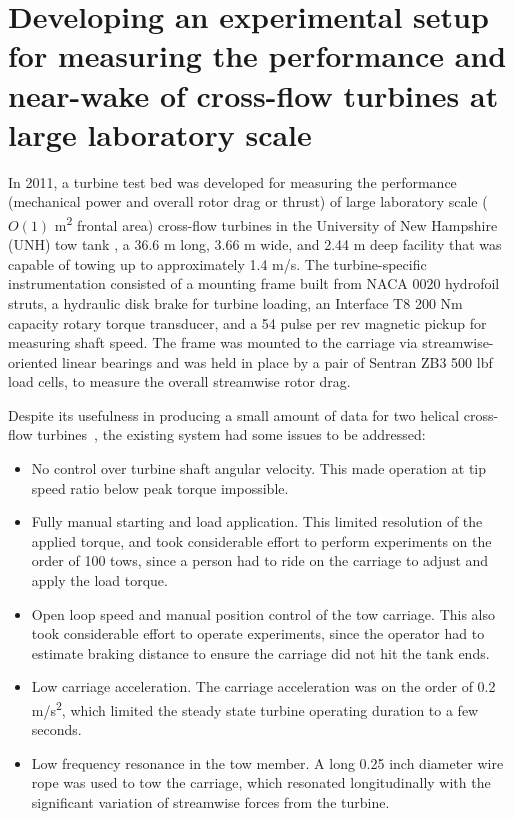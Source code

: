 \chapter{Developing an experimental setup for measuring the performance and
near-wake of cross-flow turbines at large laboratory scale}

In 2011, a turbine test bed was developed for measuring the performance
(mechanical power and overall rotor drag or thrust) of large laboratory scale
($O(1)$ m\textsuperscript{2} frontal area) cross-flow turbines in the University
of New Hampshire (UNH) tow tank \cite{Bachant2011-MS}, a 36.6 m long, 3.66 m
wide, and 2.44 m deep facility that was capable of towing up to approximately
1.4 m/s. The turbine-specific instrumentation consisted of a mounting frame
built from NACA 0020 hydrofoil struts, a hydraulic disk brake for turbine
loading, an Interface T8 200 Nm capacity rotary torque transducer, and a 54
pulse per rev magnetic pickup for measuring shaft speed. The frame was mounted
to the carriage via streamwise-oriented linear bearings and was held in place by
a pair of Sentran ZB3 500 lbf load cells, to measure the overall streamwise
rotor drag.

Despite its usefulness in producing a small amount of data for two helical
cross-flow turbines~\cite{Bachant2015-RE}, the existing system had some issues
to be addressed:
\begin{itemize}
    \item No control over turbine shaft angular velocity. This made operation at
    tip speed ratio below peak torque impossible.
    
    \item Fully manual starting and load application. This limited resolution of
    the applied torque, and took considerable effort to perform experiments on
    the order of 100 tows, since a person had to ride on the carriage to adjust
    and apply the load torque.
    
    \item Open loop speed and manual position control of the tow carriage. This
    also took considerable effort to operate experiments, since the operator had
    to estimate braking distance to ensure the carriage did not hit the tank
    ends.
    
    \item Low carriage acceleration. The carriage acceleration was on the order
    of 0.2 m/s\textsuperscript{2}, which limited the steady state turbine
    operating duration to a few seconds.
    
    \item Low frequency resonance in the tow member. A long 0.25 inch diameter
    wire rope was used to tow the carriage, which resonated longitudinally with
    the significant variation of streamwise forces from the turbine.
\end{itemize}

